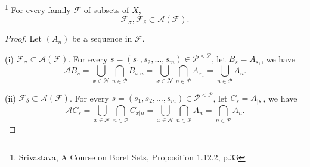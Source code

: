 \begin{proposition} \label{P:souslin_fsigma}
\footnote{Srivastava, A Course on Borel Sets, Proposition 1.12.2, p.33}
For every family $\mathcal{F}$ of subsets of $X$,
\[
	\mathcal{F}_{\sigma}, \mathcal{F}_{\delta} \subset \mathcal{A}(\mathcal{F}).
\]
\end{proposition}
\begin{proof}
Let $(A_n)$ be a sequence in $\mathcal{F}$. 

(i) $\mathcal{F}_{\sigma} \subset \mathcal{A}(\mathcal{F})$. For every
$s=(s_1,s_2,\dots,s_m)\in\mathcal{P}^{<\mathcal{P}}$, let $B_s=A_{s_1}$, we have
\[
  \mathcal{A} B_s 
    = \bigcup_{x\in\mathcal{N}} \bigcap_{n\in\mathcal{P}} B_{x|n}
    = \bigcup_{x\in\mathcal{N}} \bigcap_{n\in\mathcal{P}} A_{x_1}
    = \bigcup_{n\in\mathcal{P}} A_n.
\]

(ii) $\mathcal{F}_{\delta} \subset \mathcal{A}(\mathcal{F})$. For every
$s=(s_1,s_2,\dots,s_m)\in\mathcal{P}^{<\mathcal{P}}$, let $C_s=A_{|s|}$, we have
\[
  \mathcal{A} C_s 
    = \bigcup_{x\in\mathcal{N}} \bigcap_{n\in\mathcal{P}} C_{x|n}
    = \bigcup_{x\in\mathcal{N}} \bigcap_{n\in\mathcal{P}} A_n
    = \bigcap_{n\in\mathcal{P}} A_n.
\]
\end{proof}

